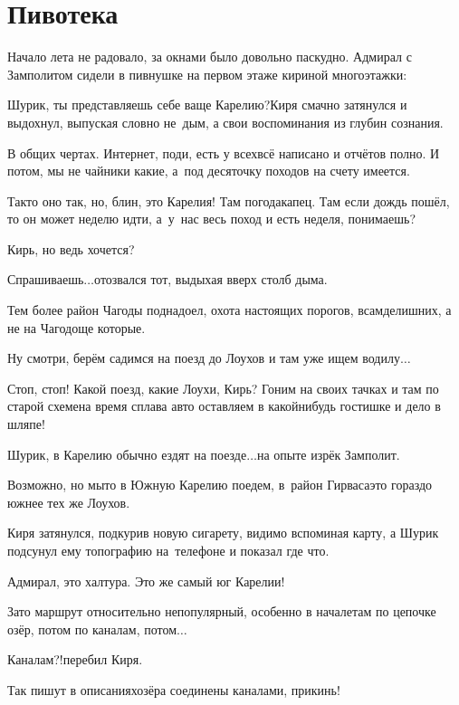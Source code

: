 \chapter{Пивотека}
\vepsianrose

Начало лета не радовало, за окнами было довольно паскудно. Адмирал с Замполитом сидели в пивнушке на первом этаже кириной многоэтажки:

\diagdash Шурик, ты представляешь себе ваще Карелию?\mdash Киря смачно затянулся и выдохнул, выпуская словно не~дым, а свои воспоминания из глубин сознания.

\diagdash В общих чертах. Интернет, поди, есть у всех\mdash всё написано и отчётов полно. И потом, мы не чайники какие, а~под десяточку походов на счету имеется. %

\diagdash Так\sdash то оно так, но, блин, это Карелия! Там погода\mdash капец. Там если дождь пошёл, то он может неделю идти, а~у~нас весь поход и есть неделя, понимаешь?

\diagdash Кирь, но ведь хочется?

\diagdash Спрашиваешь$\ldots$\mdash отозвался тот, выдыхая вверх столб дыма.

\diagdash Тем более район Чагоды поднадоел, охота настоящих порогов, всамделишних, а не на Чагодоще которые.

\diagdash Ну смотри, берём садимся на поезд до Лоухов и там уже ищем водилу$\ldots$

\diagdash Стоп, стоп! Какой поезд, какие Лоухи, Кирь? Гоним на своих тачках и там по старой схеме\mdash на время сплава авто оставляем в какой\sdash нибудь гостишке и дело в шляпе!

\diagdash Шурик, в Карелию обычно ездят на поезде$\ldots$\mdash на опыте изрёк Замполит.

\diagdash Возможно, но мы\sdash то в Южную Карелию поедем, в~район Гирваса\mdash это гораздо южнее тех же Лоухов.

Киря затянулся, подкурив новую сигарету, видимо вспоминая карту, а Шурик подсунул ему топографию на~телефоне и показал где что.

\diagdash Адмирал, это халтура. Это же самый юг Карелии!

\diagdash Зато маршрут относительно непопулярный, особенно в начале\mdash там по цепочке озёр, потом по каналам, потом$\ldots$

\diagdash Каналам?!\mdash перебил Киря.

\diagdash Так пишут в описаниях\mdash озёра соединены каналами, прикинь!


